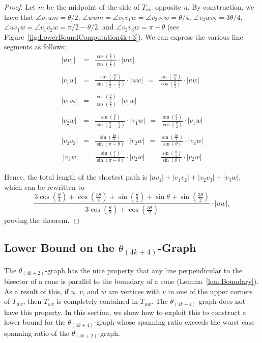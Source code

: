 \documentclass[12pt]{article}
\newenvironment{proof}{\emph{Proof.}}{\hfill $\Box$\\}
\newcommand{\Graph}[1]{\ensuremath{\theta_{(4 k + #1)}}-Graph\xspace}
\newcommand{\graph}[1]{\ensuremath{\theta_{(4 k + #1)}}-graph\xspace}
\newcommand{\canon}[2]{\ensuremath{T_{#1 #2}}}
\begin{document}
\begin{proof}
Let $m$ be the midpoint of the side of \canon{u}{w} opposite $u$. By construction, we have that $\angle v_1 u m = \theta/2$, $\angle w u m = \angle v_2 v_1 w = \angle v_3 v_2 w = \theta/4$, $\angle v_3 w v_2 = 3\theta/4$, $\angle u v_1 w = \angle v_1 v_2 w = \pi/2 - \theta/2$, and $\angle v_2 v_3 w = \pi - \theta$ (see Figure~\ref{fig:LowerBoundComputation4k+3}). We can express the various line segments as follows: 
\begin{eqnarray*}
  |u v_1| &=& \frac{\cos \left( \frac{\theta}{4} \right)}{\cos \left( \frac{\theta}{2} \right)} \cdot |u w| \\ \\ 
  |v_1 w| &=& \frac{\sin \left( \frac{3\theta}{4} \right)}{\sin \left( \frac{\pi}{2} - \frac{\theta}{2} \right)} \cdot |u w| ~~=~~ \frac{\sin \left( \frac{3\theta}{4} \right)}{\cos \left( \frac{\theta}{2} \right)} \cdot |u w| \\ \\ 
|v_1 v_2| &=& \frac{\cos \left( \frac{\theta}{4} \right)}{\cos \left( \frac{\theta}{2} \right)} \cdot |v_1 w| \\ \\
|v_2 w| &=& \frac{\sin \left( \frac{\theta}{4} \right)}{\sin \left( \frac{\pi}{2} - \frac{\theta}{2} \right)} \cdot |v_1 w| ~~=~~ \frac{\sin \left( \frac{\theta}{4} \right)}{\cos \left( \frac{\theta}{2} \right)} \cdot |v_1 w| \\ \\ 
|v_2 v_3| &=& \frac{\sin \left( \frac{3\theta}{4} \right)}{\sin (\pi - \theta)} \cdot |v_2 w| ~~=~~ \frac{\sin \left( \frac{3\theta}{4} \right)}{\sin (\theta)} \cdot |v_2 w| 
\end{eqnarray*}
\begin{eqnarray*}
|v_3 w| &=& \frac{\sin \left( \frac{\theta}{4} \right)}{\sin (\pi - \theta)} \cdot |v_2 w| ~~=~~ \frac{\sin \left( \frac{\theta}{4} \right)}{\sin (\theta)} \cdot |v_2 w|
\end{eqnarray*}

Hence, the total length of the shortest path is $|u v_1| + |v_1 v_2| + |v_2 v_3| + |v_3 w|$, which can be rewritten to \[\frac{3\cos\left(\frac{\theta}{4}\right)+\cos\left(\frac{3\theta}{4}\right)+\sin\left(\frac{\theta}{2}\right)+\sin \theta +\sin\left(\frac{3\theta}{2}\right)}{3\cos\left(\frac{\theta}{2}\right)+\cos\left(\frac{3\theta}{2}\right)} \cdot |u w|,\] proving the theorem. 
\end{proof}


\subsection{Lower Bound on the \Graph{4}}
The \graph{2} has the nice property that any line perpendicular to the bisector of a cone is parallel to the boundary of a cone (Lemma~\ref{lem:Boundary}). As a result of this, if $u$, $v$, and $w$ are vertices with $v$ in one of the upper corners of \canon{u}{w}, then \canon{w}{v} is completely contained in \canon{u}{w}. The \graph{4} does not have this property. In this section, we show how to exploit this to construct a lower bound for the \graph{4} whose spanning ratio exceeds the worst case spanning ratio of the \graph{2}. 
\end{document}
